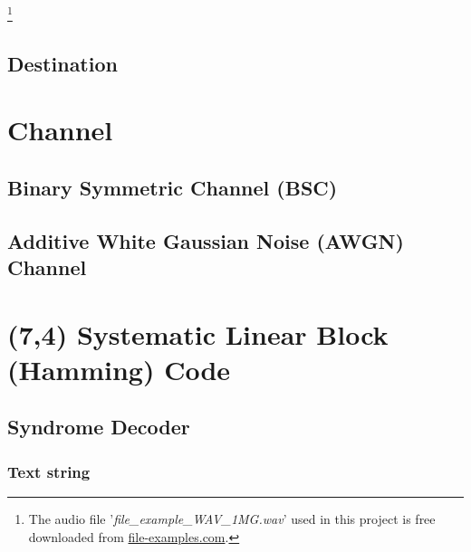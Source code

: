 \documentclass{article}
\begin{document}
\footnote{The audio file '\textit{file\_example\_WAV\_1MG.wav}' used in this project is free downloaded from \href{https://file-examples.com/index.php/sample-audio-files/sample-wav-download/}{file-examples.com}.}















\subsection{Destination}





\section{Channel}

\subsection{Binary Symmetric Channel (BSC)}











\subsection{Additive White Gaussian Noise (AWGN) Channel}










\section{(7,4) Systematic Linear Block (Hamming) Code}
\subsection{Syndrome Decoder}
\subsubsection{Text string}
\end{document}
